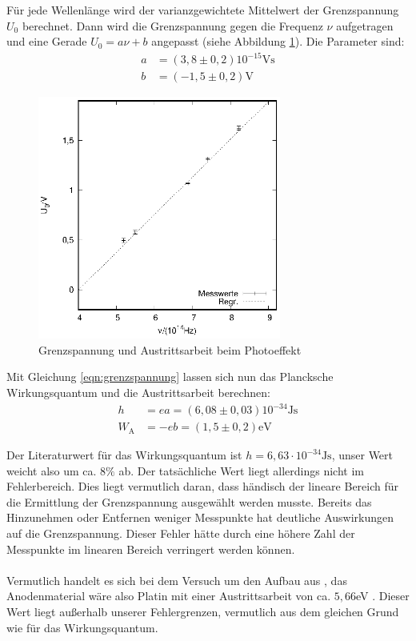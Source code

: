 \vfill
\clearpage

Für jede Wellenlänge wird der varianzgewichtete Mittelwert der Grenzspannung $U_0$ berechnet. Dann wird die Grenzspannung gegen die Frequenz $\nu$ aufgetragen und eine Gerade $U_0=a\nu+b$ angepasst (siehe Abbildung \ref{planck}). Die Parameter sind: 
\begin{align*}
  a&=(3,8 \pm 0,2)10^{-15}\mathrm{Vs}\\  
  b&=(-1,5 \pm 0,2) \mathrm{V}
\end{align*}

\begin{figure}[h]
  \centering
  \includegraphics[width=8cm]{data/Messung_photoeffekt/f_u.eps}
  \caption{Grenzspannung und Austrittsarbeit beim Photoeffekt}
  \label{planck}
\end{figure}


Mit Gleichung \ref{eqn:grenzspannung} lassen sich nun das Plancksche Wirkungsquantum und die Austrittsarbeit berechnen:
\begin{align*}
  h&=ea=(6,08 \pm 0,03)10^{-34}\mathrm{Js}\\
  W_\mathrm{A}&=-eb=(1,5 \pm 0,2)\mathrm{eV}
\end{align*}

Der Literaturwert für das Wirkungsquantum ist $h=6,63 \cdot 10^{-34}\mathrm{Js}$, unser Wert weicht also um ca. $8\%$ ab. Der tatsächliche Wert liegt allerdings nicht im Fehlerbereich. Dies liegt vermutlich daran, dass händisch der lineare Bereich für die Ermittlung der Grenzspannung ausgewählt werden musste. Bereits das Hinzunehmen oder Entfernen weniger Messpunkte hat deutliche Auswirkungen auf die Grenzspannung. Dieser Fehler hätte durch eine höhere Zahl der Messpunkte im linearen Bereich verringert werden können. \\ \\
Vermutlich handelt es sich bei dem Versuch um den Aufbau aus \cite{leybold}, das Anodenmaterial wäre also Platin mit einer Austrittsarbeit von ca. $5,66$eV \cite{kalium}. Dieser Wert liegt außerhalb unserer Fehlergrenzen, vermutlich aus dem gleichen Grund wie für das Wirkungsquantum. \\ \\

